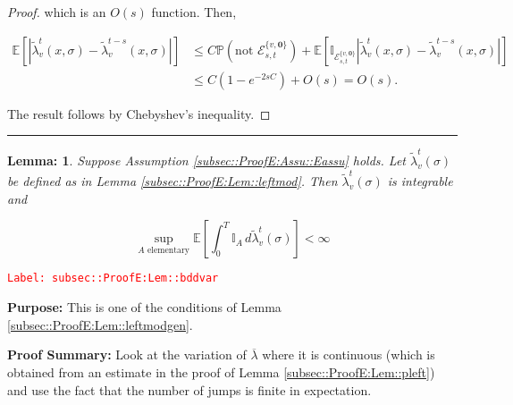 \documentclass[12pt]{article}
\newcommand{\mb}{\mathbb}
\newcommand{\mc}{\mathcal}
\newcommand{\ov}{\overline}
\newcommand{\te}{\text}
\newcommand{\tr}{\textcolor{red}}
\newcommand{\labe}[1]{\tr{\texttt{Label: #1}}}
\newcommand{\purpose}{\textbf{Purpose: }}
\newcommand{\pfsum}{\textbf{Proof Summary: }}
\newcommand{\lin}{\rule{\linewidth}{0.4 pt}}
\newcommand{\pr}{\mb{P}}							%
\newcommand{\ex}[1]{\mb{E}\left[#1\right]}			%
\renewcommand{\root}{\mathbf{0}}				%
\renewcommand{\v}{v}							%
\renewcommand{\S}{S}							%
\newcommand{\s}{\sigma}							%
\newcommand{\T}{T}								%
\newcommand{\x}{x}								%
\renewcommand{\t}{t}							%
\renewcommand{\tt}{s}							%
\newcommand{\const}{C}							%
\newcommand{\crate}[2]{\alt{\lambda}_{#1}^{#2}}		%
\newcommand{\alt}{\widetilde}						%
\newcommand{\evnt}{\mc{E}}						%
\newcommand{\typset}{A}							%
\newtheorem{lem}[thms]{Lemma: }
\begin{document}
\begin{proof}
which is an \(O(s)\) function. Then,

\begin{align*}
\ex{|\crate{\v}{\t}(\x{}{},\s) - \crate{\v}{\t-\tt}(\x{}{},\s)|} &\leq \const{}\pr\left(\te{not }\evnt^{\{\v,\root\}}_{\tt,\t}\right) + \ex{\mb{I}_{\evnt^{\{\v,\root\}}_{\tt,\t}}|\crate{\v}{\t}(\x{}{},\s) - \crate{\v}{\t-\tt}(\x{}{},\s)|}\\
&\leq \const{}(1 - e^{-2\tt\const{}}) + O(s) = O(s).
\end{align*}

The result follows by Chebyshev's inequality.
\end{proof}

\lin

\begin{lem}
Suppose Assumption \ref{subsec::ProofE:Assu::Eassu} holds. Let \(\crate{\v}{\t}(\s)\) be defined as in Lemma \ref{subsec::ProofE:Lem::leftmod}. Then \(\crate{\v}{\t}(\s)\) is integrable and 

\[\sup_{\typset\te{ elementary}} \ex{\int_0^\T \mb{I}_\typset\,d\crate{\v}{\t}(\s)} < \infty\]
\label{subsec::ProofE:Lem::bddvar}
\end{lem}
\labe{subsec::ProofE:Lem::bddvar}

\purpose This is one of the conditions of Lemma \ref{subsec::ProofE:Lem::leftmodgen}.

\pfsum Look at the variation of \(\ov{\lambda}\) where it is continuous (which is obtained from an estimate in the proof of Lemma \ref{subsec::ProofE:Lem::pleft}) and use the fact that the number of jumps is finite in expectation.
\end{document}
